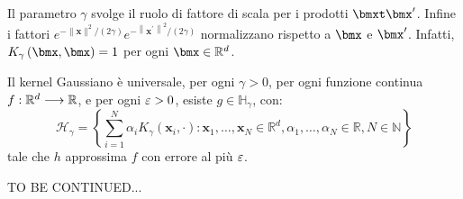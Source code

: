 \documentclass[\main/main.tex]{subfiles}
\begin{document}
\begin{multicols}{2}
\begin{definition}
    Il parametro \(\gamma\) svolge il ruolo di fattore di scala per i prodotti \(\bmxt\bmx'\). Infine i fattori \(e^{-\|\boldsymbol{x}\|^{2} /(2 \gamma)} e^{-\left\|\boldsymbol{x}^{\prime}\right\|^{2} /(2 \gamma)}\) normalizzano rispetto a \(\bmx\) e \(\bmx'\). Infatti, \(K_{\gamma}\rnd{\bmx, \bmx} = 1\) per ogni \(\bmx \in \R^d\).
\end{definition}
\begin{observation}
    Il kernel Gaussiano è universale, per ogni \(\gamma > 0\), per ogni funzione continua \(f:\mathbb{R}^d\longrightarrow \mathbb{R}\), e per ogni \(\varepsilon>0\), esiste \(g\in \mathbb{H}_{\gamma}\), con:
    \[\mathcal{H}_{\gamma}=\left\{\sum_{i=1}^{N} \alpha_{i} K_{\gamma}\left(\boldsymbol{x}_{i}, \cdot\right) : \boldsymbol{x}_{1}, \ldots, \boldsymbol{x}_{N} \in \mathbb{R}^{d}, \alpha_{1}, \ldots, \alpha_{N} \in \mathbb{R}, N \in \mathbb{N}\right\}\]
    tale che \(h\) approssima \(f\) con errore al più \(\varepsilon\).
\end{observation}
TO BE CONTINUED...
\end{multicols}
\end{document}
